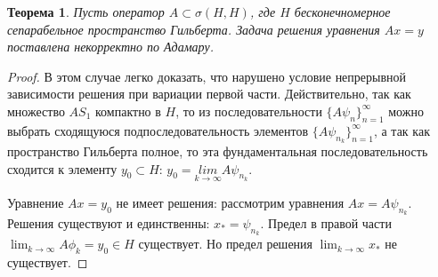 \documentclass[12pt,a4paper,titlepage, oneside]{book}
\theoremstyle{definition}
\theoremstyle{plain}
\newtheorem*{theorem}{Теорема}
\theoremstyle{remark}
\theoremstyle{remark}
\theoremstyle{remark}
\theoremstyle{remark}
\theoremstyle{plain}
\theoremstyle{plain}
\begin{document}
\begin{theorem}
Пусть оператор $A \subset \sigma (H,H)$, где $H$ бесконечномерное сепарабельное пространство Гильберта. Задача решения уравнения $Ax=y$ поставлена некорректно по Адамару.
\end{theorem}

\begin{proof}
В этом случае легко доказать, что нарушено условие непрерывной зависимости решения при вариации первой части. Действительно, так как множество $AS_1$ компактно в $H$, то из последовательности $\lbrace A \psi_n\rbrace_{n=1}^{\infty}$ можно выбрать сходящуюся подпоследовательность элементов $\lbrace A \psi_{n_k}\rbrace_{n=1}^{\infty}$, а так как пространство Гильберта полное, то эта фундаментальная последовательность сходится к элементу $y_0 \subset H$: $y_0=\underset{k \to \infty}{lim} A \psi_{n_k}$.

Уравнение $Ax = y_0$ не имеет решения: рассмотрим уравнения $Ax = A \psi_{n_k}$. Решения существуют и единственны: $x_* = \psi_{n_k}$. Предел в правой части $\displaystyle\lim_{k \to \infty} A \phi_k = y_0 \in H$ существует. Но предел решения $\displaystyle\lim_{k \to \infty} x_*$ не существует.
\end{proof}
\end{document}
